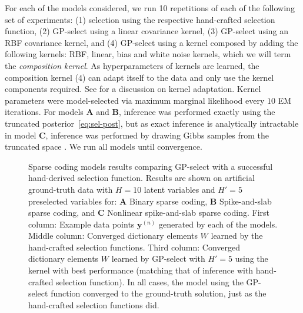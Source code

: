 \documentclass[12pt]{article}
\renewcommand{\vec}[1]{{\mathbf{#1}}}
\begin{document}
For each of the models considered, we run 10 repetitions of each of the following set of experiments: (1) selection using the respective hand-crafted selection function,
(2) GP-select using a linear covariance kernel, (3) GP-select using an RBF covariance kernel, and (4) GP-select using a kernel composed by adding the following kernels: RBF, linear, bias and white noise kernels, which we will term the \emph{composition kernel}.
As hyperparameters of kernels are learned, the composition kernel (4) can adapt itself to the data and only use the kernel components required. 
See  \citet[Chapter 4, Section 4.2.4]{RasmussenGPbook}  for a discussion on  kernel adaptation.
Kernel parameters were model-selected via maximum marginal likelihood every $10$ EM iterations.
For models \textbf{A} and \textbf{B}, inference was performed exactly using the truncated posterior~\eqref{eq:sel-post}, but as exact inference is analytically intractable in model \textbf{C}, inference was performed by drawing Gibbs samples from the truncated space \citep{SheltonEtAl2011,SheltonEtAl2012,SheltonEtAl2015}.
We run all models until convergence. 

\begin{figure}[h!]
\begin{center}
\caption{Sparse coding models results comparing GP-select with a successful hand-derived selection function.
Results are shown on artificial ground-truth data with $H=10$ latent variables and $H'=5$ preselected variables for: \textbf{A} Binary sparse coding, \textbf{B} Spike-and-slab sparse coding, and \textbf{C} Nonlinear spike-and-slab sparse coding.
First column: Example data points $\vec{y}^{(n)}$ generated by each of the models.
Middle column: Converged dictionary elements $W$ learned by the hand-crafted selection functions.
Third column: Converged dictionary elements $W$ learned by GP-select with $H'=5$ using the kernel with best performance (matching that of inference with hand-crafted selection function).
In all cases, the model using the GP-select function converged to the ground-truth solution, just as the hand-crafted selection functions did.
}\label{fig:sparse}
\end{center}
\end{figure}
\end{document}
